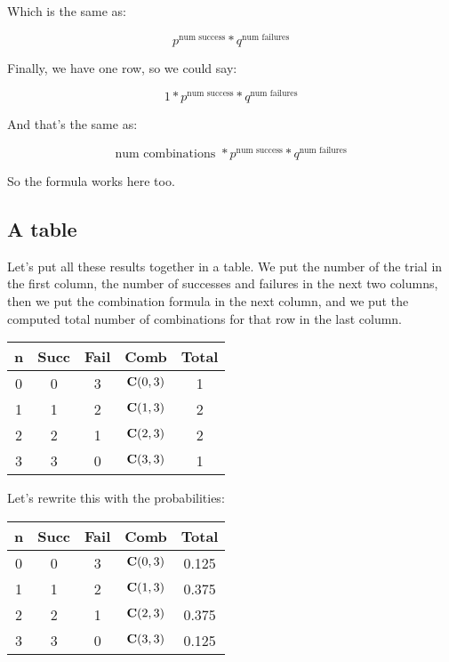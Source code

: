 \documentclass[../../../main.tex]{subfiles}
\begin{document}
Which is the same as:

\begin{equation*}
    p^{\text{num success}} * q^{\text{num failures}}
\end{equation*}

Finally, we have one row, so we could say:

\begin{equation*}
    1 * p^{\text{num success}} * q^{\text{num failures}}
\end{equation*}

And that's the same as:

\begin{equation*}
    \text{num combinations } * p^{\text{num success}} * q^{\text{num failures}}
\end{equation*}

So the formula works here too.


\subsection{A table}

Let's put all these results together in a table. We put the number of the trial in the first column, the number of successes and failures in the next two columns, then we put the combination formula in the next column, and we put the computed total number of combinations for that row in the last column.

\begin{center}
  \begin{tabular}{| c | c | c | c | c |}
    \hline
  \textbf{n} & \textbf{Succ} & \textbf{Fail} & \textbf{Comb} & \textbf{Total} \\ \hline
  0 & 0    & 3    & $\mathbf{C}(0, 3)$ & 1 \\ \hline
  1 & 1    & 2    & $\mathbf{C}(1, 3)$ & 2 \\ \hline
  2 & 2    & 1    & $\mathbf{C}(2, 3)$ & 2 \\ \hline
  3 & 3    & 0    & $\mathbf{C}(3, 3)$ & 1 \\ \hline
  \end{tabular}
\end{center}

\noindent
Let's rewrite this with the probabilities:

\begin{center}
  \begin{tabular}{| c | c | c | c | c |}
    \hline
  \textbf{n} & \textbf{Succ} & \textbf{Fail} & \textbf{Comb} & \textbf{Total} \\ \hline
  0 & 0    & 3    & $\mathbf{C}(0, 3)$ & 0.125 \\ \hline
  1 & 1    & 2    & $\mathbf{C}(1, 3)$ & 0.375 \\ \hline
  2 & 2    & 1    & $\mathbf{C}(2, 3)$ & 0.375 \\ \hline
  3 & 3    & 0    & $\mathbf{C}(3, 3)$ & 0.125 \\ \hline
  \end{tabular}
\end{center}
\end{document}
